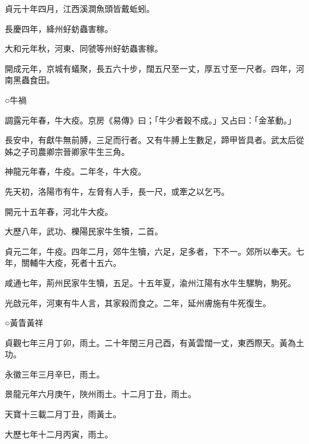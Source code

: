 \begin{pinyinscope}
 貞元十年四月，江西溪澗魚頭皆戴蚯蚓。



 長慶四年，絳州虸蚄蟲害稼。



 大和元年秋，河東、同虢等州虸蚄蟲害稼。



 開成元年，京城有蟻聚，長五六十步，闊五尺至一丈，厚五寸至一尺者。四年，河南黑蟲食田。



 ○牛禍



 調露元年春，牛大疫。京房《易傳》曰；「牛少者穀不成。」又占曰：「金革動。」



 長安中，有獻牛無前膊，三足而行者。又有牛膊上生數足，蹄甲皆具者。武太后從姊之子司農卿宗晉卿家牛生三角。



 神龍元年春，牛疫。二年冬，牛大疫。



 先天初，洛陽市有牛，左脅有人手，長一尺，或牽之以乞丐。



 開元十五年春，河北牛大疫。



 大歷八年，武功、櫟陽民家牛生犢，二首。



 貞元二年，牛疫。四年二月，郊牛生犢，六足，足多者，下不一。郊所以奉天。七年，關輔牛大疫，死者十五六。



 咸通七年，荊州民家牛生犢，五足。十五年夏，渝州江陽有水牛生騾駒，駒死。



 光啟元年，河東有牛人言，其家殺而食之。二年，延州膚施有牛死復生。



 ○黃眚黃祥



 貞觀七年三月丁卯，雨土。二十年閏三月己酉，有黃雲闊一丈，東西際天。黃為土功。



 永徽三年三月辛巳，雨土。



 景龍元年六月庚午，陜州雨土。十二月丁丑，雨土。



 天寶十三載二月丁丑，雨黃土。



 大歷七年十二月丙寅，雨土。




\end{pinyinscope}
